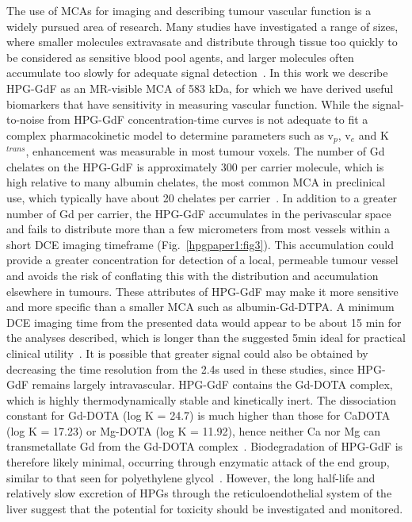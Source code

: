 The use of \acs{MCA}s for imaging and describing tumour vascular function is a widely pursued area of research.
Many studies have investigated a range of sizes, where smaller molecules extravasate and distribute through tissue too quickly to be considered as sensitive blood pool agents, and larger molecules often accumulate too slowly for adequate signal detection~\cite{Kyle:2007ch,Tang:2013fi,Sourbron:2011ce}.
In this work we describe \acs{HPG-GdF} as an MR-visible \acs{MCA} of 583 \acs{kDa}, for which we have derived useful biomarkers that have sensitivity in measuring vascular function.
While the signal-to-noise from \acs{HPG-GdF} concentration-time curves is not adequate to fit a complex pharmacokinetic model to determine parameters such as v$_p$, v$_e$ and K$^{trans}$, enhancement was measurable in most tumour voxels.
The number of Gd chelates on the \acs{HPG-GdF} is approximately 300 per carrier molecule, which is high relative to many albumin chelates, the most common \acs{MCA} in preclinical use, which typically have about 20 chelates per carrier~\cite{Ogan:1987tg}.
In addition to a greater number of Gd per carrier, the \acs{HPG-GdF} accumulates in the perivascular space and fails to distribute more than a few micrometers from most vessels within a short DCE imaging timeframe (Fig.~\ref{hpgpaper1:fig3}).
This accumulation could provide a greater concentration for detection of a local, permeable tumour vessel and avoids the risk of conflating this with the distribution and accumulation elsewhere in tumours.
These attributes of \acs{HPG-GdF} may make it more sensitive and more specific than a smaller MCA such as albumin-Gd-DTPA.
A minimum DCE imaging time from the presented data would appear to be about 15 min for the analyses described, which is longer than the suggested 5min ideal for practical clinical utility~\cite{Turetschek:2004bw}.
It is possible that greater signal could also be obtained by decreasing the time resolution from the 2.4s used in these studies, since \acs{HPG-GdF} remains largely intravascular.
\acs{HPG-GdF} contains the \acs{Gd-DOTA} complex, which is highly thermodynamically stable and kinetically inert.
The dissociation constant for \acs{Gd-DOTA} (log K = 24.7) is much higher than those for CaDOTA (log K = 17.23) or Mg-DOTA (log K = 11.92), hence neither Ca nor Mg can transmetallate Gd from the Gd-DOTA complex~\cite{Baranyai:2005ta}.
Biodegradation of \acs{HPG-GdF} is therefore likely minimal, occurring through enzymatic attack of the end group, similar to that seen for polyethylene glycol~\cite{Kawai:2002fc}.
However, the long half-life and relatively slow excretion of HPGs through the reticuloendothelial system of the liver suggest that the potential for toxicity should be investigated and monitored.
